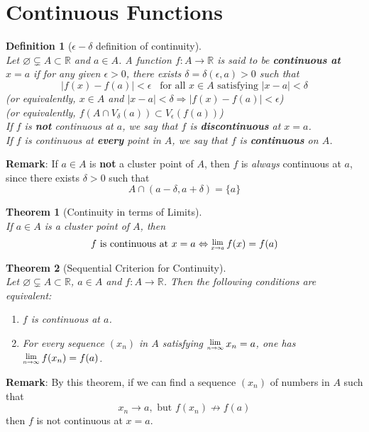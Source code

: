 \documentclass[12pt]{article}
\newcommand{\Lim}[1]{\raisebox{0.5ex}{\scalebox{0.8}{$\displaystyle \lim_{#1}\;$}}}
\newtheorem{definition}{Definition}[section]
\newtheorem{theorem}{Theorem}[section]
\theoremstyle{definition}
\begin{document}
\section{Continuous Functions}
\begin{definition}[$\epsilon-\delta$ definition of continuity]
\hfill\\\normalfont Let $\varnothing\subsetneq A\subset\mathbb{R}$ and $a\in A$. A function $f:A\to \mathbb{R}$ is said to be \textbf{continuous at} $x=a$ if for any given $\epsilon>0$, there exists $\delta=\delta(\epsilon, a)>0$ such that
\[
|f(x)-f(a)|<\epsilon\;\;\;\text{for all }x\in A\text{ satisfying }|x-a|<\delta
\]
(or equivalently, $x\in A$ and $|x-a|<\delta\Rightarrow |f(x)-f(a)|<\epsilon$)\\
(or equivalently, $f(A\cap V_\delta(a))\subset V_\epsilon(f(a))$)\\
If $f$ is \textbf{not} continuous at $a$, we say that $f$ is \textbf{discontinuous} at $x=a$.\\
If $f$ is continuous at \textbf{every} point in $A$, we say that $f$ is \textbf{continuous} on $A$.
\end{definition}
\textbf{Remark}: If $a\in A$ is \textbf{not} a cluster point of $A$, then $f$ is \textit{always} continuous at $a$, since there exists $\delta>0$ such that
\[
A\cap(a-\delta, a+\delta)=\{a\}
\] 
\begin{theorem}[Continuity in terms of Limits]
\hfill\\\normalfont If $a\in A$ is a cluster point of $A$, then
\[
f \text{ is continuous at }x=a\Leftrightarrow \Lim{x\to a}f(x)=f(a)
\]
\end{theorem}
\begin{theorem}[Sequential Criterion for Continuity]
\hfill\\\normalfont Let $\varnothing\subsetneq A\subset\mathbb{R}$, $a\in A$ and $f:A\to\mathbb{R}$. Then the following conditions are equivalent:
\begin{enumerate}
\item $f$ is continuous at $a$.
\item For every sequence $(x_n)$ in $A$ satisfying $\Lim{n\to \infty}x_n=a$, one has $\Lim{n\to \infty}f(x_n)=f(a)$.
\end{enumerate}
\end{theorem}
\textbf{Remark}: By this theorem, if we can find a sequence $(x_n)$ of numbers in $A$ such that
\[
x_n\to a,\text{  but  }f(x_n)\not\to f(a)
\]
then $f$ is not continuous at $x=a$.\\
\end{document}
